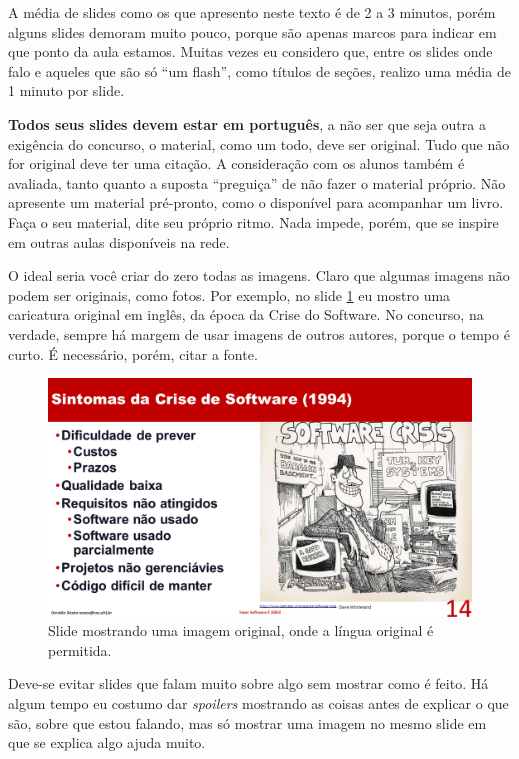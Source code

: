 \documentclass{article}
\def\tam{0.5}
\begin{document}
A média de slides como os que apresento neste texto é de 2 a 3 minutos, porém alguns slides demoram muito pouco, porque são apenas marcos para indicar em que ponto da aula estamos. Muitas vezes eu considero que, entre os slides onde falo e aqueles que são só ``um flash'', como títulos de seções, realizo uma média de 1 minuto por slide.

\textbf{Todos seus slides devem estar em português}, a não ser que seja outra a exigência do concurso, o material, como um todo, deve ser original.
Tudo que não for original deve ter uma citação.
A consideração com os alunos também é avaliada, tanto quanto a suposta ``preguiça'' de não fazer o material próprio.
Não apresente um material pré-pronto, como o disponível para acompanhar um livro.
Faça o seu material, dite seu próprio ritmo.
Nada impede, porém, que se inspire em outras aulas disponíveis na rede.

O ideal seria você criar do zero todas as imagens.
Claro que algumas imagens não podem ser originais, como fotos.
Por exemplo, no slide \ref{fig:crisis} eu mostro uma caricatura original em inglês, da época da Crise do Software.
No concurso, na verdade, sempre há  margem de usar imagens de outros autores, porque o tempo é curto.
É necessário, porém, citar a fonte.

\begin{figure}[!htb]
    \centering
    \includegraphics[width=\tam\linewidth]{imagens/crisis.png}
    \caption{Slide mostrando uma imagem original, onde a língua original é permitida.}
    \label{fig:crisis}
\end{figure}

Deve-se evitar slides que falam muito sobre algo sem mostrar como é feito.
Há algum tempo eu costumo dar \textit{spoilers} mostrando as coisas antes de explicar o que são, sobre que estou falando, mas só mostrar uma imagem no mesmo slide em que se explica algo ajuda muito.
\end{document}
